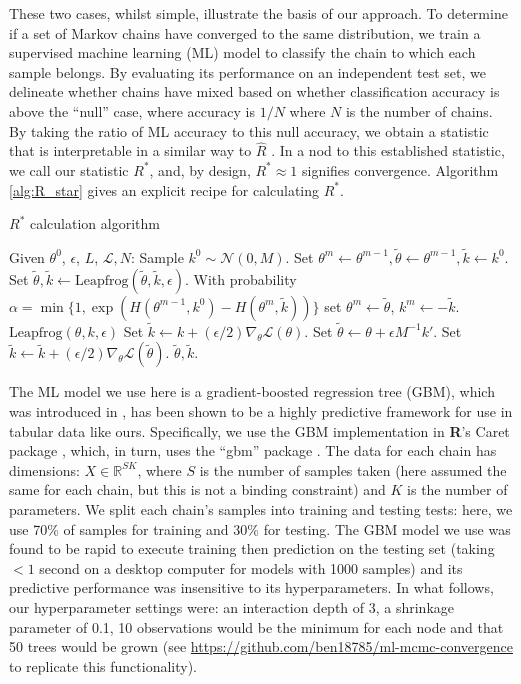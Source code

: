 \documentclass{article}
\newcommand{\N}{\mathcal{N}}
\newcommand{\cL}{\mathcal{L}}
\newcommand{\LF}{\mathrm{Leapfrog}}
\begin{document}
These two cases, whilst simple, illustrate the basis of our approach. To determine if a set of Markov chains have converged to the same distribution, we train a supervised machine learning (ML) model to classify the chain to which each sample belongs. By evaluating its performance on an independent test set, we delineate whether chains have mixed based on whether classification accuracy is above the ``null'' case, where accuracy is $1/{N}$ where $N$ is the number of chains. By taking the ratio of ML accuracy to this null accuracy, we obtain a statistic that is interpretable in a similar way to $\hat{R}$ \cite{gelman2013bayesian}. In a nod to this established statistic, we call our statistic $R^*$, and, by design, $R^*\approx 1$ signifies convergence. Algorithm \ref{alg:R_star} gives an explicit recipe for calculating $R^*$.

\begin{algorithm}[tb]
	\caption{$R^*$ calculation algorithm}
	\label{alg:R_star}
	\begin{algorithmic}
		\STATE Given $\theta^0$, $\epsilon$, $L$, $\cL, N$:
		\STATE Sample $k^0\sim\N(0, M)$.
		\STATE Set $\theta^m\leftarrow \theta^{m-1}, \tilde\theta\leftarrow \theta^{m-1}, \tilde k\leftarrow k^0$.
		\STATE Set $\tilde\theta, \tilde k \leftarrow \LF(\tilde\theta, \tilde k, \epsilon)$.
		\ENDFOR
		\STATE With probability $\alpha = \min\{1, \exp(H(\theta^{m-1}, k^0)-H(\theta^m,\tilde k))\}$
		set $\theta^m\leftarrow\tilde \theta$, $k^m\leftarrow -\tilde k$.
		\ENDFOR
		\STATE
		 $\LF(\theta, k, \epsilon)$
		\STATE Set $\tilde k \leftarrow k +
		(\epsilon/2)\nabla_\theta\cL(\theta)$.
		\STATE Set $\tilde \theta \leftarrow \theta +
		\epsilon M^{-1}k'$.
		\STATE Set $\tilde k \leftarrow \tilde k +
		(\epsilon/2)\nabla_\theta\cL(\tilde\theta)$.
		\RETURN $\tilde \theta, \tilde k$.
	\end{algorithmic}
\end{algorithm}

The ML model we use here is a gradient-boosted regression tree (GBM), which was introduced in \cite{friedman2001greedy}, has been shown to be a highly predictive framework for use in tabular data \cite{chollet2018} like ours. Specifically, we use the GBM implementation in \textbf{\textsf{R}}'s Caret package \cite{kuhn2008building}, which, in turn, uses the ``gbm'' package \cite{greenwell2019package}. The data for each chain has dimensions: $X\in \mathbb{R}^{SK}$, where $S$ is the number of samples taken (here assumed the same for each chain, but this is not a binding constraint) and $K$ is the number of parameters. We split each chain's samples into training and testing tests: here, we use 70\% of samples for training and 30\% for testing. The GBM model we use was found to be rapid to execute training then prediction on the testing set (taking $<1$ second on a desktop computer for models with 1000 samples) and its predictive performance was insensitive to its hyperparameters. In what follows, our hyperparameter settings were: an interaction depth of 3, a shrinkage parameter of 0.1, 10 observations would be the minimum for each node and that 50 trees would be grown (see \url{https://github.com/ben18785/ml-mcmc-convergence} to replicate this functionality).
\end{document}
